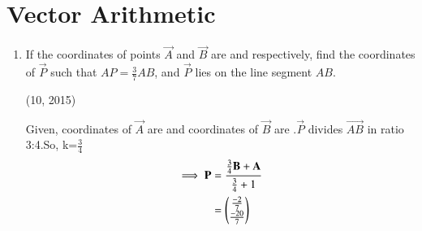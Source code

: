 \documentclass[journal]{IEEEtran}
\begin{document}

\onecolumn
\section{Vector Arithmetic}
\begin{enumerate}
 \item If the coordinates of points $\vec{A}$ and $\vec{B}$ are  and  respectively, find the coordinates of $\vec{P}$ such that $AP = \frac{3}{7} AB$, and $\vec{P}$ lies on the line segment $AB$. 
 
    \hfill {(10, 2015)}

 \solution
 Given, coordinates of $\vec{A}$ are  and coordinates of $\vec{B}$ are .$\vec{P}$ divides $\vec{AB}$ in ratio 3:4.So, k=$\frac{3}{4}$
 \begin{align*}
	 \implies \mathbf{P} &= \frac{\frac{3}{4}\mathbf{B} + \mathbf{A}}{\frac{3}{4} + 1} \\
	 &= \begin{pmatrix}\frac{-2}{7}\\\frac{-20}{7}\end{pmatrix} 
 \end{align*}
          \begin{figure}
	  \begin{center}
     
		  
	 \end{center}	  
         \end{figure}
\end{enumerate}
\end{document}
